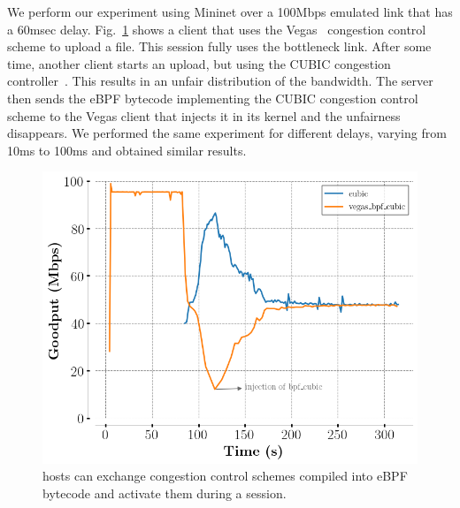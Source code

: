 We perform our experiment using Mininet over a 100Mbps emulated link
that has a 60msec delay. Fig.~\ref{fig:vegasCubic} shows a client that uses the \tcp Vegas~\cite{10.1145/190314.190317} congestion control scheme to upload a file. This \tcpls session fully uses the bottleneck link. After some time, another client starts an upload, but using the CUBIC congestion controller~\cite{rfc8312}. This results in an unfair distribution of the
bandwidth. The server then sends the eBPF bytecode implementing the CUBIC congestion control scheme to the \tcp Vegas client that injects it in its kernel and the unfairness disappears. We performed the same experiment for different delays, varying from 10ms to 100ms and obtained similar results.

\begin{figure}[!t]
  \begin{center}
    \includegraphics[width=.8\columnwidth]{pretty_plotify/plots/vegas_cubic.png}
  \end{center}
\vspace{-0.5cm}
  \caption{\tcpls hosts can exchange congestion control schemes compiled into eBPF bytecode and activate them during a \tcpls session.}
  \label{fig:vegasCubic}
\end{figure}
